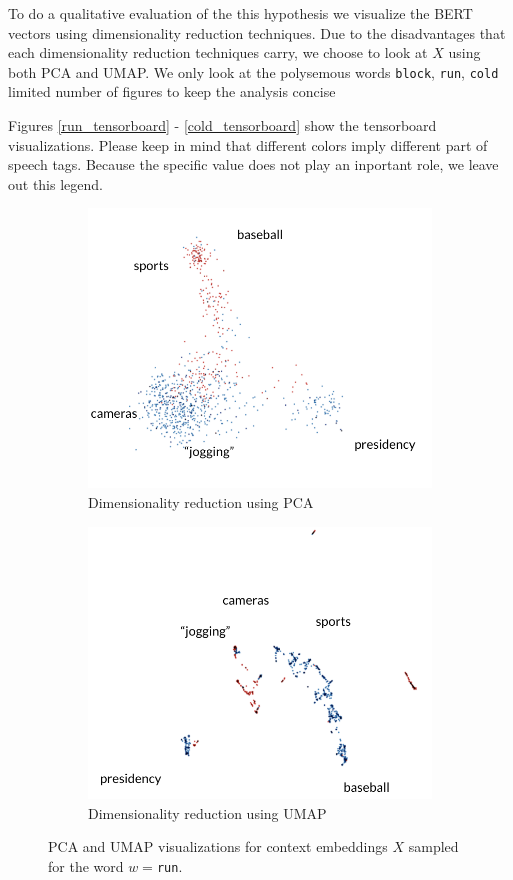 \documentclass[a4paper,12pt,twoside,openright]{report}
\begin{document}
To do a qualitative evaluation of the this hypothesis we visualize the BERT vectors using dimensionality reduction techniques.
Due to the disadvantages that each dimensionality reduction techniques carry, we choose to look at $X$ using both PCA and UMAP.
We only look at the polysemous words \Verb#block#, \Verb#run#, \Verb#cold# limited number of figures to keep the analysis concise 

Figures \eqref{run_tensorboard} - \eqref{cold_tensorboard} show  the tensorboard visualizations.
Please keep in mind that different colors imply different part of speech tags. 
Because the specific value does not play an inportant role, we leave out this legend.

\begin{figure}[H]
\begin{subfigure}{.45\textwidth}
  \centering
  \includegraphics[width=.8\linewidth]{./assets/analysis/run_pca.png}
  \caption{Dimensionality reduction using PCA}
  \label{fig:sfig1}
\end{subfigure}%
\hfill
\begin{subfigure}{.45\textwidth}
  \centering
  \includegraphics[width=.8\linewidth]{./assets/analysis/run_umap.png}
  \caption{Dimensionality reduction using UMAP}
  \label{fig:sfig2}
\end{subfigure}
\caption{PCA and UMAP visualizations for context embeddings $X$ sampled for the word $w=$\texttt{run}. }
\label{fig:run_tensorboard}
\end{figure}
\end{document}
